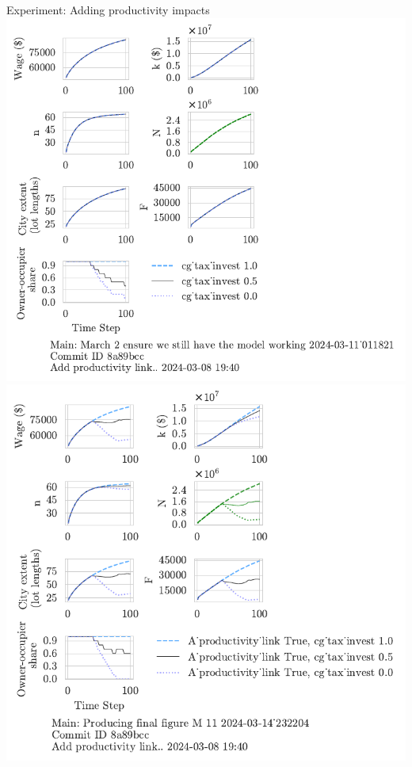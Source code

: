 \documentclass[hide notes=show/only]{beamer} %
\begin{document}
\begin{frame}{Experiment: Adding productivity impacts}
     \includegraphics[scale=.55, trim={0 1.4cm 4.5cm 0},clip]{fig/cg_tax_invest-Main-011821.pdf} %
    \includegraphics[scale=.55, trim={0 1.4cm 3.8cm 0},clip]{fig/With-productivity_linkcg_tax_invest-232204.pdf} 
\end{frame}%
\end{document}
